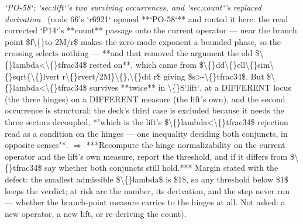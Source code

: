 \begin{description}
\textit{`PO-58`; `sec:lift`'s two surviving occurrences, and `sec:count`'s replaced derivation} \ (node 66's `r6921` opened **`PO-58`** and routed it here: the read corrected `P14`'s **count** passage onto the current operator --- near the branch point \$f\textbackslash\{\}to-2M/r\$ makes the zero-mode exponent a bounded phase, so the crossing selects nothing --- **and that removed the argument the old \$\textbackslash\{\}lambda<\textbackslash\{\}tfrac34\$ rested on**, which came from \$\textbackslash\{\}dd\textbackslash\{\}ell\textbackslash\{\}sim\textbackslash\{\}sqrt\{\textbackslash\{\}lvert r\textbackslash\{\}rvert/2M\}\textbackslash\{\},\textbackslash\{\}dd r\$ giving \$s>-\textbackslash\{\}tfrac34\$. But \$\textbackslash\{\}lambda<\textbackslash\{\}tfrac34\$ survives **twice** in \textbackslash\{\}S`lift`, at a DIFFERENT locus (the three hinges) on a DIFFERENT measure (the lift's own), and the second occurrence is structural: the deck's third case is excluded because it needs the three sectors decoupled, *"which is the lift's \$\textbackslash\{\}lambda<\textbackslash\{\}tfrac34\$ rejection read as a condition on the hinges --- one inequality deciding both conjuncts, in opposite senses"*. \ensuremath{\Rightarrow} ***Recompute the hinge normalizability on the current operator and the lift's own measure, report the threshold, and if it differs from \$\textbackslash\{\}tfrac34\$ say whether both conjuncts still hold.*** Margin stated with the defect: the smallest admissible \$\textbackslash\{\}lambda\$ is \$1\$, so any threshold below \$1\$ keeps the verdict; at risk are the number, its derivation, and the step never run --- whether the branch-point measure carries to the hinges at all.  Not asked: a new operator, a new lift, or re-deriving the count). 

\end{description}
